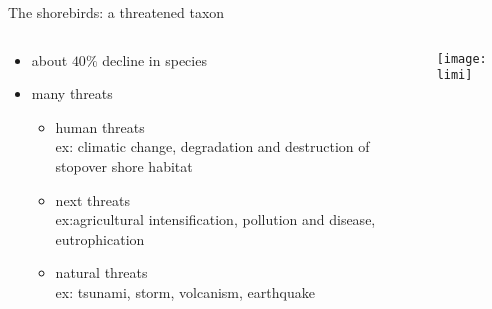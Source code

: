 \documentclass[10pt,compress]{beamer}
\begin{document}
\begin{frame}{The shorebirds: a threatened taxon}
 \begin{columns}
    \begin{column}[c]{0.55\textwidth}
      \begin{itemize}[<+->]
      \item about $40 \%$ decline in species {\tiny \cite{Zoeckler2003,Studds2017}}
      \item many threats {\tiny \cite{Sutherland2012}}
        \begin{itemize}
        \item human threats \\{\footnotesize ex: climatic change,
            degradation and destruction of stopover shore habitat}
        \item next threats \\{\footnotesize ex:agricultural intensification, pollution and disease, eutrophication}
        \item natural threats \\{\footnotesize ex: tsunami,
            storm, volcanism, earthquake}
        \end{itemize}
      \end{itemize}
    \end{column}
    \begin{column}[c]{0.45\textwidth}
      \begin{center}
       \texttt{[image: limi]}     
      \end{center}
    \end{column}
  \end{columns}
\end{frame}
\end{document}
